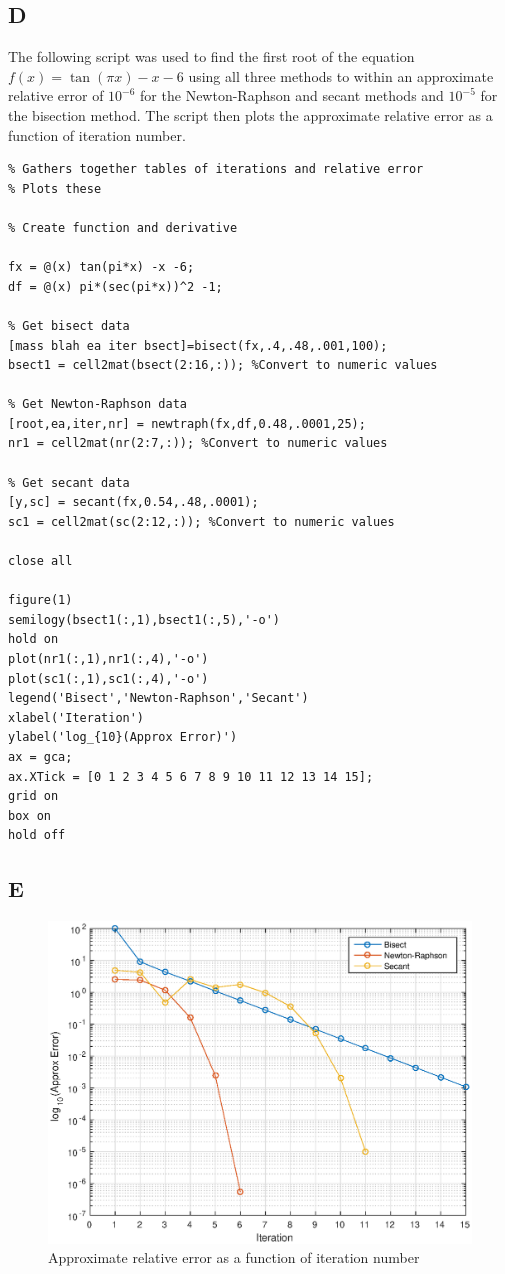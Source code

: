 \documentclass{article}
\begin{document}
\subsection*{D}

The following script was used to find the first root of the equation $ f(x) = \tan(\pi x) -x -6 $ using all three methods to within an approximate relative error of $ 10^{-6} $ for the Newton-Raphson and secant methods and $ 10^{-5} $ for the bisection method.  The script then plots the approximate relative error as a function of iteration number.

\begin{lstlisting}
% Gathers together tables of iterations and relative error
% Plots these

% Create function and derivative

fx = @(x) tan(pi*x) -x -6;
df = @(x) pi*(sec(pi*x))^2 -1;

% Get bisect data
[mass blah ea iter bsect]=bisect(fx,.4,.48,.001,100);
bsect1 = cell2mat(bsect(2:16,:)); %Convert to numeric values

% Get Newton-Raphson data
[root,ea,iter,nr] = newtraph(fx,df,0.48,.0001,25);
nr1 = cell2mat(nr(2:7,:)); %Convert to numeric values

% Get secant data
[y,sc] = secant(fx,0.54,.48,.0001);
sc1 = cell2mat(sc(2:12,:)); %Convert to numeric values

close all

figure(1)
semilogy(bsect1(:,1),bsect1(:,5),'-o')
hold on
plot(nr1(:,1),nr1(:,4),'-o')
plot(sc1(:,1),sc1(:,4),'-o')
legend('Bisect','Newton-Raphson','Secant')
xlabel('Iteration')
ylabel('log_{10}(Approx Error)')
ax = gca;
ax.XTick = [0 1 2 3 4 5 6 7 8 9 10 11 12 13 14 15];
grid on
box on
hold off
\end{lstlisting}

\subsection*{E}

\begin{figure}[H]
\centering
\includegraphics[width=6.5in]{Problem2.eps}
\caption{Approximate relative error as a function of iteration number}
\end{figure}
\end{document}

